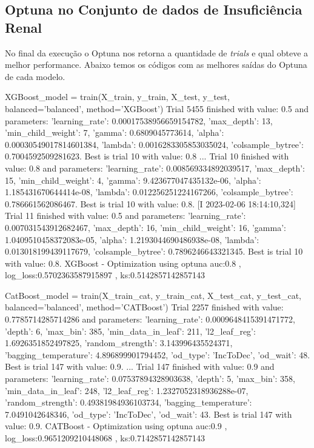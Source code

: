 \subsection{Optuna no Conjunto de dados de Insuficiência Renal}
No final da execução o Optuna nos retorna a quantidade de \textit{trials} e qual obteve a melhor performance. Abaixo temos os códigos com as melhores saídas do Optuna de cada modelo.
\begin{codigo}[caption={Resultado do Optuna no conjunto de dados de Insuficiência Renal.}, label={codigo:res:op:ren}, language=Python, breaklines=true]
XGBoost_model = train(X_train, y_train, X_test, y_test, balanced='balanced', method='XGBoost')
Trial 5455 finished with value: 0.5 and parameters: {'learning_rate': 0.00017538956659154782, 'max_depth': 13, 'min_child_weight': 7, 'gamma': 0.6809045773614, 'alpha': 0.00030549017814601384, 'lambda': 0.0016283305853035024, 'colsample_bytree': 0.7004592509281623}. Best is trial 10 with value: 0.8
...
Trial 10 finished with value: 0.8 and parameters: {'learning_rate': 0.008569334892039517, 'max_depth': 15, 'min_child_weight': 4, 'gamma': 9.423677047435132e-06, 'alpha': 1.185431670644414e-08, 'lambda': 0.012256251224167266, 'colsample_bytree': 0.786661562086467}. Best is trial 10 with value: 0.8.
[I 2023-02-06 18:14:10,324] Trial 11 finished with value: 0.5 and parameters: {'learning_rate': 0.007031543912682467, 'max_depth': 16, 'min_child_weight': 16, 'gamma': 1.0409510458372083e-05, 'alpha': 1.2193044690486938e-08, 'lambda': 0.013018199439117679, 'colsample_bytree': 0.7896246643321345}. Best is trial 10 with value: 0.8.
XGBoost - Optimization using optuna
auc:0.8 , log_loss:0.5702363587915897 , ks:0.5142857142857143

CatBoost_model = train(X_train_cat, y_train_cat, X_test_cat, y_test_cat, balanced='balanced', method='CATBoost')
Trial 2257 finished with value: 0.7785714285714286 and parameters: {'learning_rate': 0.0009648415391471772, 'depth': 6, 'max_bin': 385, 'min_data_in_leaf': 211, 'l2_leaf_reg': 1.6926351852497825, 'random_strength': 3.143996435524371, 'bagging_temperature': 4.896899901794452, 'od_type': 'IncToDec', 'od_wait': 48}. Best is trial 147 with value: 0.9.
...
Trial 147 finished with value: 0.9 and parameters: {'learning_rate': 0.07537894328903638, 'depth': 5, 'max_bin': 358, 'min_data_in_leaf': 248, 'l2_leaf_reg': 1.2327052318936288e-07, 'random_strength': 0.49381984936103734, 'bagging_temperature': 7.0491042648346, 'od_type': 'IncToDec', 'od_wait': 43}. Best is trial 147 with value: 0.9.
CATBoost - Optimization using optuna
auc:0.9 , log_loss:0.9651209210448068 , ks:0.7142857142857143


\end{codigo}
